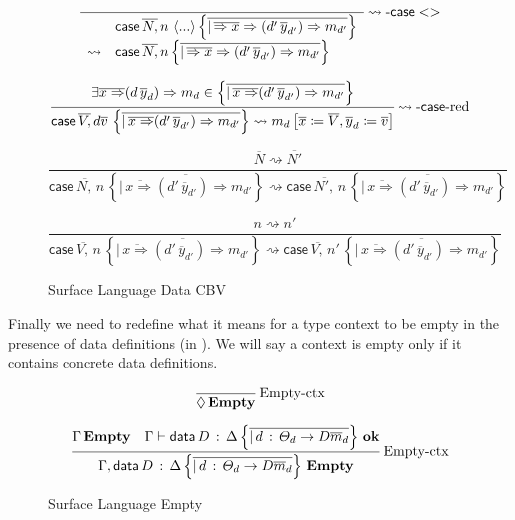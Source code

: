 \begin{figure}
\[
\frac{\,}{
  \begin{array}{rl}
   & \mathsf{case}\,\overline{N,}\,n\,\left\langle ...\right\rangle \left\{ \overline{|\,\overline{\Rightarrow x}\Rightarrow(d'\,\overline{y}_{d'})\Rightarrow m_{d'}}\right\} \\
   \rightsquigarrow & \mathsf{case}\,\overline{N,}\,n\left\{ \overline{|\,\overline{\Rightarrow x}\Rightarrow(d'\,\overline{y}_{d'})\Rightarrow m_{d'}}\right\} 
  \end{array}
   }\operatorname{\rightsquigarrow-\mathsf{case}{}<>}
\]

\[
\frac{\exists\overline{x\Rightarrow}(d\,\overline{y}_{d})\Rightarrow m_{d}\in\left\{ \overline{|\,\overline{x\Rightarrow}(d'\,\overline{y}_{d'})\Rightarrow m_{d'}}\right\} }{\mathsf{case}\,\overline{V,}\,d\overline{v}\,\left\{ \overline{|\,\overline{x\Rightarrow}(d'\,\overline{y}_{d'})\Rightarrow m_{d'}}\right\} \rightsquigarrow m_{d}\left[\overline{x}\coloneqq\overline{V},\overline{y}_{d}\coloneqq\overline{v}\right]
}\operatorname{\rightsquigarrow-\mathsf{case}{}-red}
\]

\[
\frac{\overline{N}\rightsquigarrow\overline{N'}}{\mathsf{case}\,\overline{N,}\,n\,\left\{ \overline{|\,\overline{x\Rightarrow}(d'\,\overline{y}_{d'})\Rightarrow m_{d'}}\right\} \rightsquigarrow\mathsf{case}\,\overline{N',}\,n\,\left\{ \overline{|\,\overline{x\Rightarrow}(d'\,\overline{y}_{d'})\Rightarrow m_{d'}}\right\} }\,
\]

\[
\frac{n\rightsquigarrow n'}{\mathsf{case}\,\overline{V,}\,n\,\left\{ \overline{|\,\overline{x\Rightarrow}(d'\,\overline{y}_{d'})\Rightarrow m_{d'}}\right\} \rightsquigarrow\mathsf{case}\,\overline{V,}\,n'\,\left\{ \overline{|\,\overline{x\Rightarrow}(d'\,\overline{y}_{d'})\Rightarrow m_{d'}}\right\} }\,
\]

\caption{Surface Language Data CBV}
\label{fig:surface-data-cbv}
\end{figure}

Finally we need to redefine what it means for a type context to be empty in the presence of data definitions (in ).
We will say a context is empty only if it contains concrete data definitions.

\begin{figure}
\[
\frac{\ }{\lozenge\,\mathbf{Empty}}\rulename{Empty-ctx}
\]

\[
\frac{\Gamma\,\mathbf{Empty}\quad\Gamma\vdash\mathsf{data}\,D\,:\,\Delta\left\{ \overline{|\,d\,:\,\varTheta_{d}\rightarrow D\overline{m}_{d}}\right\} \,\mathbf{ok}}{\Gamma,\mathsf{data}\,D\,:\,\Delta\left\{ \overline{|\,d\,:\,\varTheta_{d}\rightarrow D\overline{m}_{d}}\right\} \,\mathbf{Empty}}\operatorname{Empty-ctx}
\]

\caption{Surface Language Empty}
\label{fig:surface-data-empty}
\end{figure}

